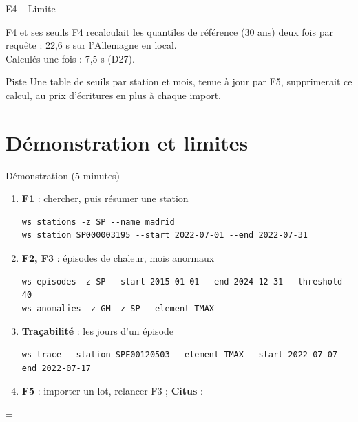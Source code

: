 \documentclass[aspectratio=169]{pres}
\begin{document}
\begin{frame}{E4 -- Limite}
  \begin{block}{F4 et ses seuils}
    F4 recalculait les quantiles de référence (30 ans) deux fois par requête : 22,6 s sur l'Allemagne en local.\\
    Calculés une fois : 7,5 s (D27).
  \end{block}
  \begin{block}{Piste}
    Une table de seuils par station et mois, tenue à jour par F5, supprimerait ce calcul, au prix d'écritures en plus à chaque import.
  \end{block}
\end{frame}

\section{Démonstration et limites}

\begin{frame}[fragile]{Démonstration (5 minutes)}
  \small
  \begin{enumerate}
    \item \textbf{F1} : chercher, puis résumer une station
\begin{lstlisting}[basicstyle=\ttfamily\scriptsize,frame=none]
ws stations -z SP --name madrid
ws station SP000003195 --start 2022-07-01 --end 2022-07-31
\end{lstlisting}
    \item \textbf{F2, F3} : épisodes de chaleur, mois anormaux
\begin{lstlisting}[basicstyle=\ttfamily\scriptsize,frame=none]
ws episodes -z SP --start 2015-01-01 --end 2024-12-31 --threshold 40
ws anomalies -z GM -z SP --element TMAX
\end{lstlisting}
    \item \textbf{Traçabilité} : les jours d'un épisode
\begin{lstlisting}[basicstyle=\ttfamily\scriptsize,frame=none]
ws trace --station SPE00120503 --element TMAX --start 2022-07-07 --end 2022-07-17
\end{lstlisting}
    \item \textbf{F5} : importer un lot, relancer F3 ; \textbf{Citus} : 
  \end{enumerate}
   = 
\end{frame}
\end{document}
